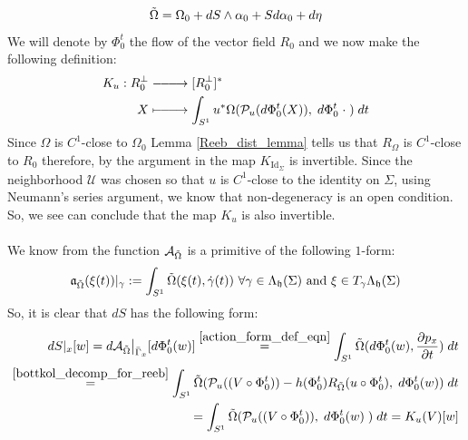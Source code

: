 \documentclass[11pt]{amsart}
\theoremstyle{plain}
\theoremstyle{definition}
\theoremstyle{remark}
\DeclareRobustCommand{\looongrightarrow}{%
\DOTSB\relbar\joinrel\relbar\joinrel\relbar\joinrel\rightarrow
}
\DeclareRobustCommand{\looongmapsto}{\DOTSB\mapstochar\looongrightarrow}
\begin{document}
\begin{align}\label{Omega_tilde_full_expansion}
    \Tilde{\Omega} = \Omega_0 + dS \wedge \alpha_0 + Sd\alpha_0 + d\eta
\end{align}
We will denote by $\Phi^t_0$ the flow of the vector field $R_0$ and we now make the following definition:
\begin{align}\label{def_of_K}
    K_{u}: R_{0}^{\perp} &\looongrightarrow [R^{\perp}_{0}]^* \nonumber\\
X &\looongmapsto \int_{S^1}  u^*\Omega(\mathcal{P}_{u}(d\Phi^t_0(X)), \; d\Phi^t_0\;\cdot \;) \; dt
\end{align}
Since $\Omega$ is $C^1$-close to $\Omega_0$ Lemma \ref{Reeb_dist_lemma} tells us that $R_{\Omega}$ is $C^1$-close to $R_0$ therefore, by the argument in \cite[Claim 3.9]{Kerman} the map $K_{\text{Id}_{\Sigma}}$ is invertible. Since the neighborhood $\mathcal{U}$ was chosen so that $u$ is $C^1$-close to the identity on $\Sigma$, using Neumann's series argument, we know that non-degeneracy is an open condition. So, we see can conclude that the map $K_u$ is also invertible. \\
\\
We know from \cite[Pg. 33]{B-K-Odd_Symp} the function $\mathcal{A}_{\Tilde{\Omega}}$ is a primitive of the following $1$-form:
\begin{align}\label{action_form_def_eqn}
 \mathfrak{a}_{\Tilde{\Omega}}(\xi(t))|_{\gamma}:= \int_{S^1} \Tilde{\Omega}(\xi(t), \Dot{\gamma}(t)) \text{ } \forall \gamma \in \Lambda_{\mathfrak{h}}(\Sigma) \text{ and } \xi \in T_{\gamma}\Lambda_{\mathfrak{h}}(\Sigma)
\end{align}
So, it is clear that $dS$ has the following form:
\begin{align}\label{dS=K(V)}
dS|_x[w] = d\mathcal{A}_{\tilde{\Omega}}\big|_{\bar{\Gamma}_x}[d\Phi^t_0 (w)] \stackrel{\eqref{action_form_def_eqn}}{=} \int_{S^1} \tilde{\Omega}(d\Phi^t_0(w) ,\frac{ \partial p_x}{\partial t}) \; dt \\\nonumber \stackrel{\eqref{bottkol_decomp_for_reeb}}{=}  \int_{S^1} \tilde{\Omega}( \mathcal{P}_u((V \circ \Phi^t_0)) - h(\Phi^t_0) R_{\tilde{\Omega}}(u \circ \Phi^t_0), \; d\Phi^t_0(w)) \; dt \\\nonumber
= \int_{S^1} \tilde{\Omega}( \mathcal{P}_u((V \circ \Phi^t_0)), \; d\Phi^t_0 (w) \;) \; dt = K_u(V)[w]
\end{align}
\end{document}
